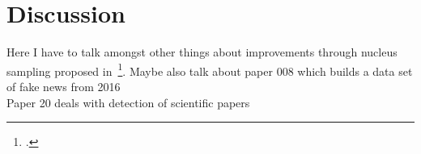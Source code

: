 \section{Discussion}
\label{ch:discussion}

Here I have to talk amongst other things about improvements through nucleus sampling proposed in~\footcite{DBLP:journals/corr/abs-1904-09751}. Maybe also talk about paper 008 which builds a data set of fake news from 2016 \\
Paper 20 deals with detection of scientific papers